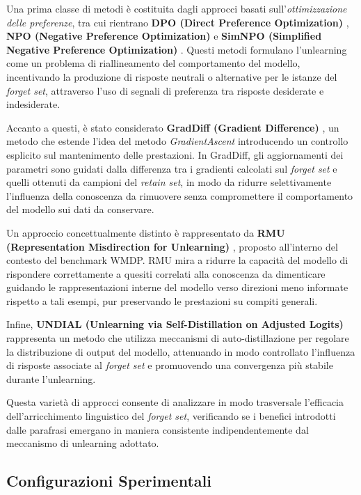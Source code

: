 Una prima classe di metodi è costituita dagli approcci basati sull’\textit{ottimizzazione delle preferenze}, tra cui rientrano \textbf{DPO (Direct Preference Optimization)} \cite{maini2024tofu}, \textbf{NPO (Negative Preference Optimization)} \cite{zhang_negative_2024} e \textbf{SimNPO (Simplified Negative Preference Optimization)} \cite{fan_simplicity_2024}. Questi metodi formulano l’unlearning come un problema di riallineamento del comportamento del modello, incentivando la produzione di risposte neutrali o alternative per le istanze del \emph{forget set}, attraverso l’uso di segnali di preferenza tra risposte desiderate e indesiderate.

Accanto a questi, è stato considerato \textbf{GradDiff (Gradient Difference)} \cite{maini2024tofu}, un metodo che estende l’idea del metodo \emph{GradientAscent} introducendo un controllo esplicito sul mantenimento delle prestazioni. In GradDiff, gli aggiornamenti dei parametri sono guidati dalla differenza tra i gradienti calcolati sul \emph{forget set} e quelli ottenuti da campioni del \emph{retain set}, in modo da ridurre selettivamente l’influenza della conoscenza da rimuovere senza compromettere il comportamento del modello sui dati da conservare.

Un approccio concettualmente distinto è rappresentato da \textbf{RMU (Representation Misdirection for Unlearning)} \cite{li2024wmdpbenchmarkmeasuringreducing}, proposto all’interno del contesto del benchmark WMDP. RMU mira a ridurre la capacità del modello di rispondere correttamente a quesiti correlati alla conoscenza da dimenticare guidando le rappresentazioni interne del modello verso direzioni meno informate rispetto a tali esempi, pur preservando le prestazioni su compiti generali.

Infine, \textbf{UNDIAL (Unlearning via Self-Distillation on Adjusted Logits)} \cite{dong_undial_2024} rappresenta un metodo che utilizza meccanismi di auto-distillazione per regolare la distribuzione di output del modello, attenuando in modo controllato l’influenza di risposte associate al \emph{forget set} e promuovendo una convergenza più stabile durante l’unlearning.

Questa varietà di approcci consente di analizzare in modo trasversale l’efficacia dell’arricchimento linguistico del \emph{forget set}, verificando se i benefici introdotti dalle parafrasi emergano in maniera consistente indipendentemente dal meccanismo di unlearning adottato.

\subsection{Configurazioni Sperimentali}

